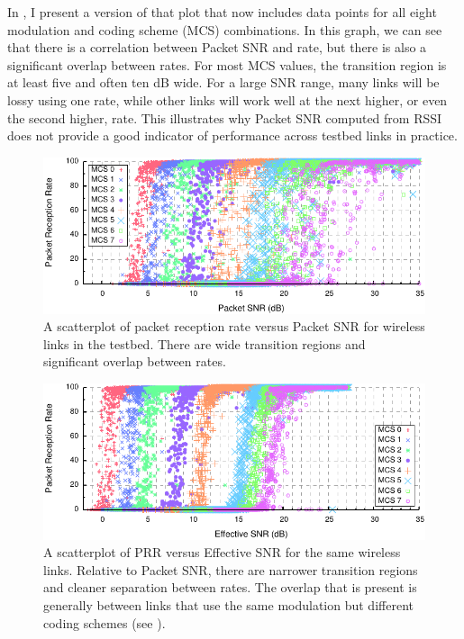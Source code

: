 In , I present a version of that plot that now includes data points for all eight modulation and coding scheme (MCS) combinations. In this graph, we can see that there is a correlation between Packet SNR and rate, but there is also a significant overlap between rates. For most MCS values, the transition region is at least five and often ten dB wide. For a large SNR range, many links will be lossy using one rate, while other links will work well at the next higher, or even the second higher, rate. This illustrates why Packet SNR computed from RSSI does not provide a good indicator of performance across testbed links in practice.

\begin{figure}[t!]
	\centering
	\includegraphics[width=\textwidth]{figures/delivery/snr_prr_scatter_siso.pdf}
	\caption[PRR vs SNR for all SISO modulations]{\label{fig:snr_prr_siso} A scatterplot of packet reception rate versus Packet SNR for wireless links in the testbed. There are wide transition regions and significant overlap between rates.}
\end{figure}
\begin{figure}[t!]
	\centering
	\includegraphics[width=\textwidth]{figures/delivery/esnr_prr_scatter_siso.pdf}
	\caption[PRR vs Effective SNR for all SISO modulations]{\label{fig:esnr_prr_siso}A scatterplot of PRR versus Effective SNR for the same wireless links. Relative to Packet SNR, there are narrower transition regions and cleaner separation between rates. The overlap that is present is generally between links that use the same modulation but different coding schemes (see ).}
\end{figure}

